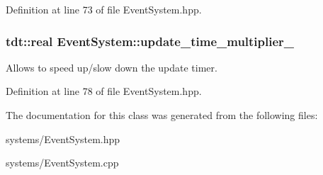Definition at line 73 of file Event\+System.\+hpp.

\subsubsection[{\texorpdfstring{update\+\_\+time\+\_\+multiplier\+\_\+}{update_time_multiplier_}}]{\setlength{\rightskip}{0pt plus 5cm}tdt\+::real Event\+System\+::update\+\_\+time\+\_\+multiplier\+\_\+\hspace{0.3cm}{\ttfamily [private]}}\hypertarget{class_event_system_a28113a32ef8e7f3a415251b815ac7d0f}{}\label{class_event_system_a28113a32ef8e7f3a415251b815ac7d0f}


Allows to speed up/slow down the update timer. 



Definition at line 78 of file Event\+System.\+hpp.



The documentation for this class was generated from the following files\+:\begin{DoxyCompactItemize}
\item 
systems/Event\+System.\+hpp\item 
systems/Event\+System.\+cpp\end{DoxyCompactItemize}
